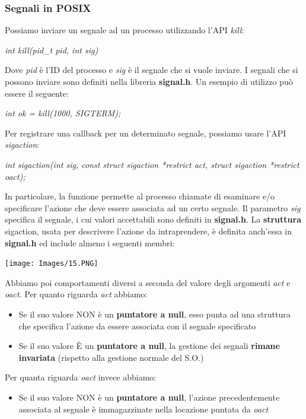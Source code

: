 \documentclass[12pt]{article}
\begin{document}
\subsubsection{Segnali in POSIX}
Possiamo inviare un segnale ad un processo utilizzando l'API \textit{kill}:
\begin{center}
    \textit{int kill(pid\_t pid, int sig)}
\end{center}
Dove \textit{pid} è l'ID del processo e \textit{sig} è il segnale che si vuole inviare.
I segnali che si possono inviare sono definiti nella libreria \textbf{signal.h}.
Un esempio di utilizzo può essere il seguente:
\begin{center}
    \textit{int ok = kill(1000, SIGTERM);}
\end{center}
Per registrare una callback per un determinato segnale, possiamo usare l'API \textit{sigaction}:
\begin{center}
    \textit{int sigaction(int sig, const struct sigaction *restrict act, struct sigaction *restrict oact);}
\end{center}
In particolare, la funzione permette al processo chiamate di esaminare e/o specificare l'azione che deve essere associata ad un certo segnale.
Il parametro \textit{sig} specifica il segnale, i cui valori accettabili sono definiti in \textbf{signal.h}. La \textbf{struttura} sigaction, usata per
descrivere l'azione da intraprendere, è definita anch'essa in \textbf{signal.h} ed include almeno i seguenti membri:
\begin{center}
    \texttt{[image: Images/15.PNG]}
\end{center}
Abbiamo poi comportamenti diversi a seconda del valore degli argomenti \textit{act} e \textit{oact}. Per quanto
riguarda \textit{act} abbiamo:
\begin{itemize}
    \item Se il suo valore NON è un \textbf{puntatore a null}, esso punta ad una struttura che specifica l'azione da essere associata con il segnale specificato
    \item Se il suo valore È un \textbf{puntatore a null}, la gestione dei segnali \textbf{rimane invariata} (rispetto alla gestione normale del S.O.)
\end{itemize}
Per quanta riguarda \textit{oact} invece abbiamo:
\begin{itemize}
    \item Se il suo valore NON è un \textbf{puntatore a null}, l'azione precedentemente associata al segnale è immagazzinate nella locazione puntata da \textit{oact}
\end{itemize}
\end{document}
